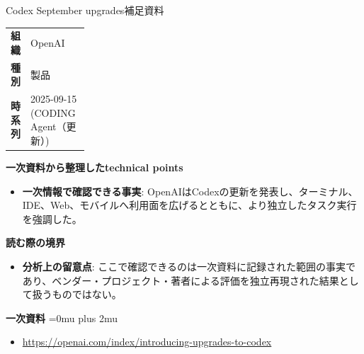 \begin{technicalnote}{Codex September upgrades}{補足資料}
\begingroup
\begin{tabularx}{\linewidth}{@{}>{\bfseries}p{0.22\linewidth}X@{}}
組織 & OpenAI \\
種別 & 製品 \\
時系列 & 2025-09-15 (CODING Agent（更新）) \\
\end{tabularx}
\smallskip
{\bfseries 一次資料から整理したtechnical points}
\begin{itemize}[leftmargin=1.5em,itemsep=0.35em]
\item \textbf{一次情報で確認できる事実}: OpenAIはCodexの更新を発表し、ターミナル、IDE、Web、モバイルへ利用面を広げるとともに、より独立したタスク実行を強調した。
\end{itemize}
\begin{minipage}{\linewidth}
{\bfseries 読む際の境界}
\begin{itemize}[leftmargin=1.5em,itemsep=0.35em]
\item \textbf{分析上の留意点}: ここで確認できるのは一次資料に記録された範囲の事実であり、ベンダー・プロジェクト・著者による評価を独立再現された結果として扱うものではない。
\end{itemize}
\begin{samepage}
{\bfseries 一次資料}
\begingroup\sloppy
\Urlmuskip=0mu plus 2mu\relax
\begin{itemize}[leftmargin=1.5em,itemsep=0.25em]
\item {\scriptsize\url{https://openai.com/index/introducing-upgrades-to-codex}}
\end{itemize}
\endgroup
\end{samepage}
\end{minipage}
\endgroup
\end{technicalnote}
\medskip
